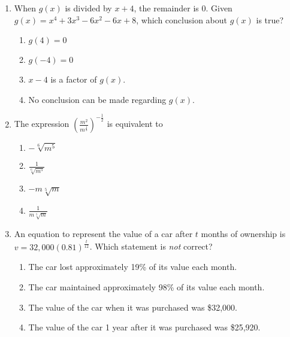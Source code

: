 \documentclass[12pt, twoside]{article}
\begin{document}
\begin{enumerate}
\item When $g(x)$ is divided by $x+4$, the remainder is 0. Given $g(x)= x^4+3x^3-6x^2-6x+8$, which conclusion about $g(x)$ is true?
\begin{enumerate}
    \item $g(4)=0$
    \item $g(-4)=0$
    \item $x-4$ is a factor of $g(x)$.
    \item No conclusion can be made regarding $g(x)$.
\end{enumerate} %

\newpage
\item The expression $\displaystyle \left( \frac{m^2}{m^\frac{1}{3}}\right)^{-\frac{1}{2}}$ is equivalent to
\begin{enumerate}
    \item $-\sqrt[6]{m^5}$
    \item $\displaystyle \frac{1}{\sqrt[6]{m^5}}$
    \item $-m \sqrt[5]{m}$
    \item $\displaystyle \frac{1}{m \sqrt[5]{m}}$ \\[.5in]
\end{enumerate} %


\item An equation to represent the value of a car after $t$ months of ownership is\\ $\displaystyle v=32,000(0.81)^{\frac{t}{12}}$. Which statement is \emph{not} correct?
\begin{enumerate}
    \item The car lost approximately 19\% of its value each month.
    \item The car maintained approximately 98\% of its value each month.
    \item The value of the car when it was purchased was \$32,000.
    \item The value of the car 1 year after it was purchased was \$25,920.
\end{enumerate} %


\end{enumerate}
\end{document}
